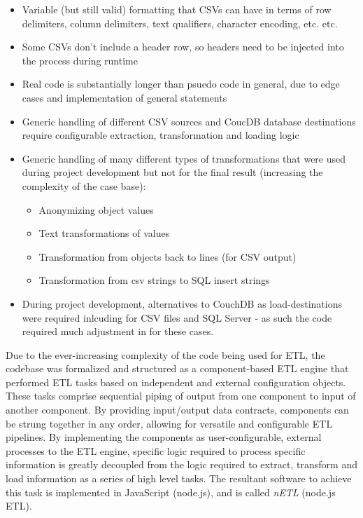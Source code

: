\begin{itemize}
  \item Variable (but still valid) formatting that CSVs can have in terms of row delimiters, column delimiters, text qualifiers, character encoding, etc. etc.
  \item Some CSVs don't include a header row, so headers need to be injected into the process during runtime
  \item Real code is substantially longer than psuedo code in general, due to edge cases and implementation of general statements
  \item Generic handling of different CSV sources and CoucDB database destinations require configurable extraction, transformation and loading logic
  \item Generic handling of many different types of transformations that were used during project development but not for the final result (increasing the complexity of the case base):
        \begin{itemize}
          \item Anonymizing object values
          \item Text transformations of values
          \item Transformation from objects back to lines (for CSV output)
          \item Transformation from csv strings to SQL insert strings
        \end{itemize}
  \item During project development, alternatives to CouchDB as load-destinations were required inlcuding for CSV files and SQL Server - as such the code required much adjustment in for these cases.
\end{itemize}

Due to the ever-increasing complexity of the code being used for ETL, the codebase was formalized and structured as a component-based ETL engine that performed ETL tasks based on independent and external configuration objects. These tasks comprise sequential piping of output from one component to input of another component. By providing input/output data contracts, components can be strung together in any order, allowing for versatile and configurable ETL pipelines. By implementing the components as user-configurable, external processes to the ETL engine, specific logic required to process specific information is greatly decoupled from the logic required to extract, transform and load information as a series of high level tasks. The resultant software to achieve this task is implemented in JavaScript (node.js), and is called \textit{nETL} (node.js ETL).

